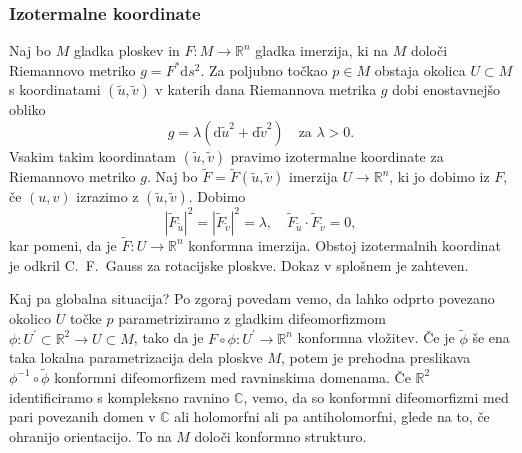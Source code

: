 \documentclass[8pt]{beamer}
\theoremstyle{definition}
\theoremstyle{remark}
\theoremstyle{plain}
\numberwithin{equation}{section}  %
\begin{document}
\begin{frame}
    \frametitle{Izotermalne koordinate}

    Naj bo $M$ gladka ploskev in $F: M \rightarrow \mathbb{R}^n$ gladka imerzija, ki na $M$ določi Riemannovo metriko $g = F^* \mathrm{d}s^2$. Za poljubno točkao $p \in M$ obstaja okolica $U \subset M$ s koordinatami $(\tilde{u}, \tilde{v})$ v katerih dana Riemannova metrika $g$ dobi enostavnejšo obliko 
    \begin{equation*}
        g=\lambda\left(\mathrm{d} \tilde{u}^2+\mathrm{d} \tilde{v}^2\right) \quad \text{za } \lambda > 0.
    \end{equation*}
    Vsakim takim koordinatam $(\tilde{u}, \tilde{v})$ pravimo \textcolor{red1}{izotermalne koordinate} za Riemannovo metriko $g$. Naj bo $\widetilde{F}=\widetilde{F}(\tilde{u}, \tilde{v})$ imerzija $U \rightarrow \mathbb{R}^n$, ki jo dobimo iz $F$, če $(u, v)$ izrazimo z $(\tilde{u}, \tilde{v})$. Dobimo 
    \begin{equation*}
        \left|\widetilde{F}_{\tilde{u}}\right|^2=\left|\widetilde{F}_{\tilde{v}}\right|^2=\lambda, \quad \widetilde{F}_{\tilde{u}} \cdot \widetilde{F}_{\tilde{v}}=0,
    \end{equation*}
    kar pomeni, da je $\widetilde{F}: U \rightarrow \mathbb{R}^n$ konformna imerzija. Obstoj izotermalnih koordinat je odkril C.~F.~Gauss za rotacijske ploskve. Dokaz v splošnem je zahteven. 

    \vspace{0.8em}

    Kaj pa globalna situacija? Po zgoraj povedam vemo, da lahko odprto povezano okolico $U$ točke $p$ parametriziramo z gladkim difeomorfizmom $\phi: U^{\prime}\subset \mathbb{R}^2 \rightarrow U \subset M$, tako da je $F \circ \phi: U^{\prime} \rightarrow \mathbb{R}^n$ konformna vložitev.
    Če je $\tilde{\phi}$ še ena taka lokalna parametrizacija dela ploskve $M$, potem je \textcolor{red1}{prehodna preslikava} $\phi^{-1} \circ \tilde{\phi}$ konformni difeomorfizem med ravninskima domenama. Če $\mathbb{R}^2$ identificiramo s kompleksno ravnino $\mathbb{C}$, vemo, da so konformni difeomorfizmi med pari povezanih domen v $\mathbb{C}$ ali holomorfni ali pa antiholomorfni, glede na to, če ohranijo orientacijo. To na $M$ določi konformno strukturo. 
    
\end{frame}
\end{document}
